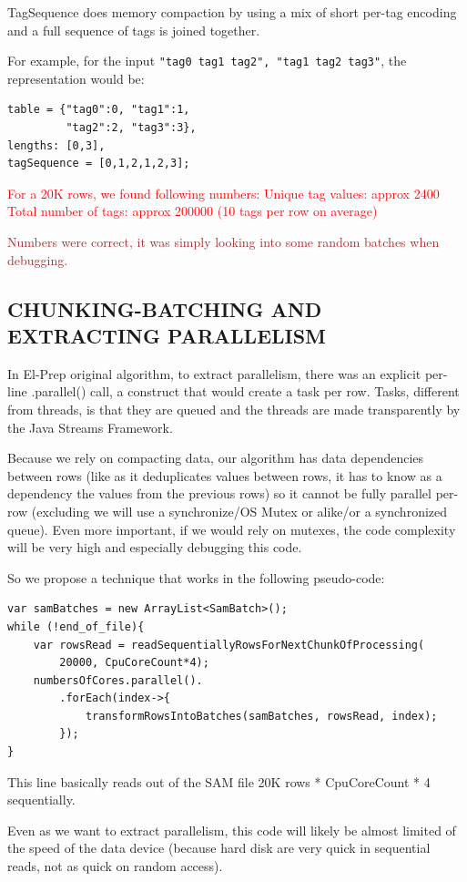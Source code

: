 \documentclass[a4paper,twoside]{article}
\begin{document}
TagSequence does memory compaction by using a mix of short per-tag encoding and a full sequence of tags is joined together.

For example, for the input {\tt "tag0 tag1 tag2", "tag1 tag2 tag3"}, the representation would be:
\begin{verbatim}
table = {"tag0":0, "tag1":1, 
         "tag2":2, "tag3":3},
lengths: [0,3], 
tagSequence = [0,1,2,1,2,3]; 
\end{verbatim}

\textcolor{red}{
For a 20K rows, we found following numbers:
Unique tag values: approx 2400
Total number of tags: approx 200000 (10 tags per row on average)
}

\textcolor{brown}{ Numbers were correct, it was simply looking into some random batches when debugging.
}



\subsection{\uppercase{Chunking-Batching and Extracting Parallelism}}
In El-Prep original algorithm, to extract parallelism, there was an explicit per-line .parallel() call, a construct that would create a task per row. Tasks, different from threads,
is that they are queued and the threads are made transparently by the Java Streams Framework.

Because we rely on compacting data, our algorithm has data dependencies between rows (like as it deduplicates values between rows, it has to know as a dependency the values from the previous rows) so it cannot be fully parallel per-row (excluding we will use a synchronize/OS Mutex or alike/or a synchronized queue). Even more important, if we would rely on mutexes, the code complexity will be very high and especially debugging this code.

So we propose a technique that works in the following pseudo-code:

\begin{verbatim}
var samBatches = new ArrayList<SamBatch>();
while (!end_of_file){
	var rowsRead = readSequentiallyRowsForNextChunkOfProcessing(
		20000, CpuCoreCount*4);
	numbersOfCores.parallel().
		.forEach(index->{
			transformRowsIntoBatches(samBatches, rowsRead, index);
		});
}
\end{verbatim}

This line basically reads out of the SAM file 20K rows * CpuCoreCount * 4 sequentially.

Even as we want to extract parallelism, this code will likely be almost limited of the speed of the data device (because hard disk are very quick in sequential reads,
not as quick on random access).
\end{document}
